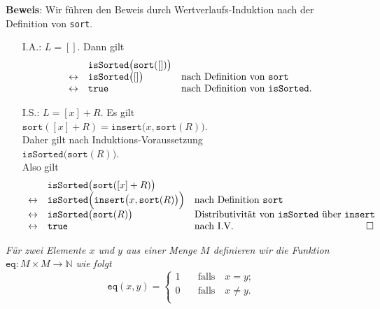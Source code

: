 \noindent
\textbf{Beweis}: Wir f\"uhren den Beweis durch Wertverlaufs-Induktion nach der Definition von \texttt{sort}.
\begin{enumerate}
\item[I.A.:] $L = []$. Dann gilt 
      $$
      \begin{array}[b]{lll}
                      & \mathtt{isSorted}\bigl(\mathtt{sort}([]) \bigr) \\
      \leftrightarrow & \mathtt{isSorted}\bigl([] \bigr) & \mbox{nach Definition von \texttt{sort}} \\
      \leftrightarrow & \mathtt{true}                    & \mbox{nach Definition von \texttt{isSorted}}.
      \end{array}
      $$
\item[I.S.:] $L = [x] + R$.  Es gilt \\[0.1cm]
      \hspace*{1.3cm} 
      $\mathtt{sort}([x] + R) = \mathtt{insert}\bigl(x, \mathtt{sort}(R)\bigr)$. \\[0.1cm]
      Daher gilt nach Induktions-Voraussetzung \\[0.1cm]
      \hspace*{1.3cm} 
      $\mathtt{isSorted}\bigl(\mathtt{sort}(R) \bigr)$.  \\[0.1cm]
      Also gilt 
      $$
      \begin{array}[b]{lll}
                      & \mathtt{isSorted}\bigl(\mathtt{sort}([x] + R)\bigr) \\
      \leftrightarrow & \mathtt{isSorted}\Bigl(\mathtt{insert}\bigl(x, \mathtt{sort}(R)\bigr)\Bigr) &
      \mbox{nach Definition \texttt{sort}}  \\
      \leftrightarrow & \mathtt{isSorted}\bigl(\mathtt{sort}(R)\bigr) &
      \mbox{Distributivit\"at von \texttt{isSorted} \"uber \texttt{insert}}  \\
      \leftrightarrow & \mathtt{true} &
      \mbox{nach I.V.}  \\
      \end{array}
      \hspace*{-0.5cm} \Box
      $$
\end{enumerate}

\begin{Definition}[$\texttt{eq}(x,y)$]
{\em
  F\"ur zwei Elemente $x$ und $y$ aus einer Menge $M$  definieren wir die Funktion
  $\mathtt{eq}: M \times M \rightarrow \mathbb{N}$  wie folgt
  \[
  \mathtt{eq}(x,y) = \left\{
  \begin{array}{ll}
    1 & \quad \mbox{falls}\quad x = y; \\
    0 & \quad \mbox{falls}\quad x \not= y. \\
  \end{array}
  \right.
  \]
}
\end{Definition}

